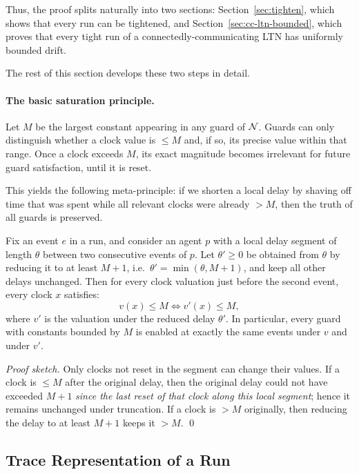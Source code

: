 Thus, the proof splits naturally into two sections:
Section~\ref{sec:tighten}, which shows that every run can be tightened, and
Section~\ref{sec:cc-ltn-bounded}, which proves that every tight run of a
connectedly-communicating LTN has uniformly bounded drift.

The rest of this section develops these two steps in detail.

\paragraph*{The basic saturation principle.}
Let $M$ be the largest constant appearing in any guard of $\mathcal{N}$. Guards can only distinguish whether a clock value is $\le M$ and, if so, its precise value within that range. Once a clock exceeds $M$, its exact magnitude becomes irrelevant for future guard satisfaction, until it is reset.

This yields the following meta-principle: if we shorten a local delay by shaving off time that was spent while all relevant clocks were already $>M$, then the truth of all guards is preserved.

\begin{lemma}\label{lem:saturation}
Fix an event $e$ in a run, and consider an agent $p$ with a local delay segment of length $\theta$ between two consecutive events of $p$. Let $\theta' \ge 0$ be obtained from $\theta$ by reducing it to at least $M{+}1$, i.e.\ $\theta' = \min(\theta, M{+}1)$, and keep all other delays unchanged.
Then for every clock valuation just before the second event, every clock $x$ satisfies:
\[
    v(x) \le M \iff v'(x) \le M,
\]
where $v'$ is the valuation under the reduced delay $\theta'$. In particular, every guard with constants bounded by $M$ is enabled at exactly the same events under $v$ and under $v'$.
\end{lemma}

\begin{proof}[Proof sketch]
Only clocks not reset in the segment can change their values. If a clock is $\le M$ after the original delay, then the original delay could not have exceeded $M{+}1$ \emph{since the last reset of that clock along this local segment}; hence it remains unchanged under truncation. If a clock is $>M$ originally, then reducing the delay to at least $M{+}1$ keeps it $>M$. \qed
\end{proof}

\subsection{Trace Representation of a Run}

